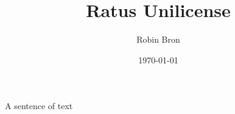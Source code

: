 \documentclass[a4paper,12pt]{article}
\begin{document}
  \title{Ratus Unilicense}
  \author{Robin Bron}
  \date{\today}
  \maketitle

  \tableofcontents

  A sentence of text
\end{document}

